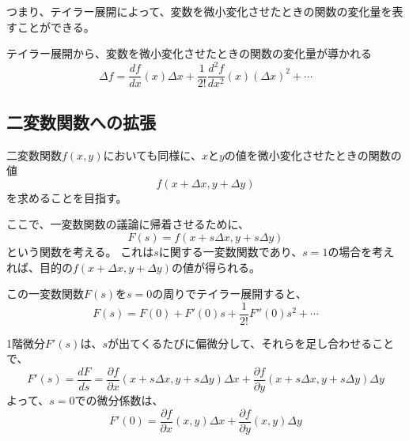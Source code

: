 \documentclass[../../../topic_calculus]{subfiles}
\begin{document}
つまり、テイラー展開によって、変数を微小変化させたときの関数の変化量を表すことができる。

\begin{emphabox}
  \begin{spacebox}
    \begin{center}
      テイラー展開から、変数を微小変化させたときの関数の変化量が導かれる
      \begin{equation*}
  \Delta f = \frac{df}{dx}(x)\Delta x + \frac{1}{2!}\frac{d^2 f}{dx^2}(x)(\Delta x)^2 + \cdots
\end{equation*}
    \end{center}
  \end{spacebox}
\end{emphabox}

\subsection{二変数関数への拡張}

二変数関数$f(x,y)$においても同様に、$x$と$y$の値を微小変化させたときの関数の値
\begin{equation*}
  f(x + \Delta x, y + \Delta y)
\end{equation*}
を求めることを目指す。

\br

ここで、一変数関数の議論に帰着させるために、
\begin{equation*}
  F(s) = f(x + s\Delta x, y + s\Delta y)
\end{equation*}
という関数を考える。
これは$s$に関する一変数関数であり、$s=1$の場合を考えれば、目的の$f(x + \Delta x, y + \Delta y)$の値が得られる。

\br

この一変数関数$F(s)$を$s=0$の周りでテイラー展開すると、
\begin{equation*}
  F(s) = F(0) + F'(0)s + \frac{1}{2!}F''(0)s^2 + \cdots
\end{equation*}

\br

1階微分$F'(s)$は、$s$が出てくるたびに偏微分して、それらを足し合わせることで、
\begin{equation*}
  F'(s) = \frac{dF}{ds} = \frac{\partial f}{\partial x}(x + s\Delta x, y + s\Delta y)\Delta x + \frac{\partial f}{\partial y}(x + s\Delta x, y + s\Delta y)\Delta y
\end{equation*}
よって、$s = 0$での微分係数は、
\begin{equation*}
  F'(0) = \frac{\partial f}{\partial x}(x, y)\Delta x + \frac{\partial f}{\partial y}(x, y)\Delta y
\end{equation*}
\end{document}
